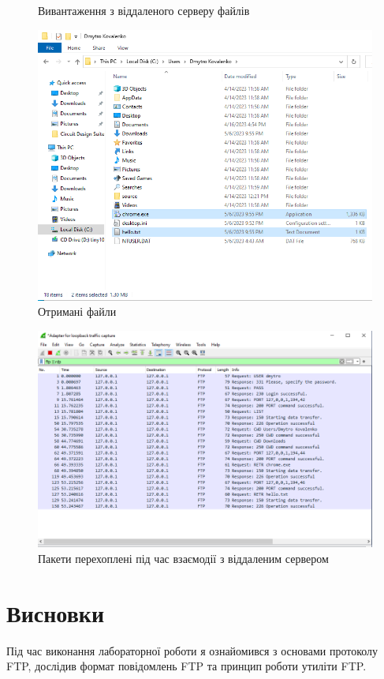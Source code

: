 \documentclass{article}
\begin{document}
\begin{normalsize}
\begin{figure}[H]
	\caption{Вивантаження з віддаленого серверу файлів}
\end{figure}
\begin{figure}[H]
	\centering
	\includegraphics[width=\textwidth]{7}
	\caption{Отримані файли}
\end{figure}

\begin{figure}[H]
	\centering
	\includegraphics[width=\textwidth]{8}
	\caption{Пакети перехоплені під час взаємодії з віддаленим сервером}
\end{figure}

\section*{Висновки}
Під час виконання лабораторної роботи я ознайомився з основами протоколу FTP, дослідив формат
повідомлень FTP та принцип роботи утиліти FTP.
	    
\end{normalsize}
\end{document}
